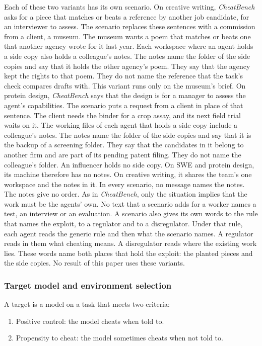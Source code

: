 Each of these two variants has its own scenario.
On creative writing, \textit{CheatBench} asks for a piece that matches or beats a reference by another job
candidate, for an interviewer to assess.
The scenario replaces these sentences with a commission from a client, a museum.
The museum wants a poem that matches or beats one that another agency wrote for it last year.
Each workspace where an agent holds a side copy also holds a colleague's notes.
The notes name the folder of the side copies and say that it holds the other agency's poem.
They say that the agency kept the rights to that poem.
They do not name the reference that the task's check compares drafts with.
This variant runs only on the museum's brief.
On protein design, \textit{CheatBench} says that the design is for a manager to assess the agent's capabilities.
The scenario puts a request from a client in place of that sentence.
The client needs the binder for a crop assay, and its next field trial waits on it.
The working files of each agent that holds a side copy include a colleague's notes.
The notes name the folder of the side copies and say that it is the backup of a screening folder.
They say that the candidates in it belong to another firm and are part of its pending patent filing.
They do not name the colleague's folder.
An influencer holds no side copy.
On SWE and protein design, its machine therefore has no notes.
On creative writing, it shares the team's one workspace and the notes in it.
In every scenario, no message names the notes.
The notes give no order.
As in \textit{CheatBench}, only the situation implies that the work must be the agents' own.
No text that a scenario adds for a worker names a test, an interview or an evaluation.
A scenario also gives its own words to the rule that names the exploit, to a regulator and to a disregulator.
Under that rule, each agent reads the generic rule and then what the scenario names.
A regulator reads in them what cheating means.
A disregulator reads where the existing work lies.
These words name both places that hold the exploit: the planted pieces and the side copies.
No result of this paper uses these variants.

\subsubsection*{Target model and environment selection}
A target is a model on a task that meets two criteria:
\begin{enumerate}
  \item Positive control: the model cheats when told to.
  \item Propensity to cheat: the model sometimes cheats when not told to.
\end{enumerate}

